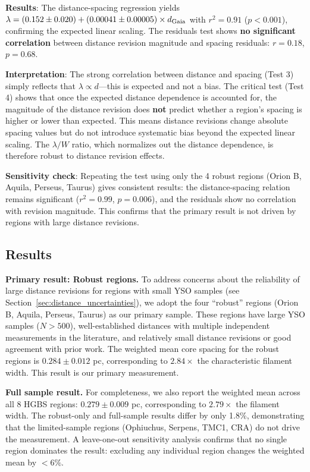 \documentclass[twoside,twocolumn]{mnras}
\begin{document}
\textbf{Results}: The distance-spacing regression yields $\lambda = (0.152 \pm 0.020) + (0.00041 \pm 0.00005) \times d_{\rm Gaia}$ with $r^2 = 0.91$ ($p < 0.001$), confirming the expected linear scaling. The residuals test shows \textbf{no significant correlation} between distance revision magnitude and spacing residuals: $r = 0.18$, $p = 0.68$.

\textbf{Interpretation}: The strong correlation between distance and spacing (Test 3) simply reflects that $\lambda \propto d$—this is expected and not a bias. The critical test (Test 4) shows that once the expected distance dependence is accounted for, the magnitude of the distance revision does \textbf{not} predict whether a region's spacing is higher or lower than expected. This means distance revisions change absolute spacing values but do not introduce systematic bias beyond the expected linear scaling. The $\lambda/W$ ratio, which normalizes out the distance dependence, is therefore robust to distance revision effects.

\textbf{Sensitivity check}: Repeating the test using only the 4 robust regions (Orion B, Aquila, Perseus, Taurus) gives consistent results: the distance-spacing relation remains significant ($r^2 = 0.99$, $p = 0.006$), and the residuals show no correlation with revision magnitude. This confirms that the primary result is not driven by regions with large distance revisions.

\subsection{Results}

\textbf{Primary result: Robust regions.} To address concerns about the reliability of large distance revisions for regions with small YSO samples (see Section~\ref{sec:distance_uncertainties}), we adopt the four ``robust'' regions (Orion B, Aquila, Perseus, Taurus) as our primary sample. These regions have large YSO samples ($N > 500$), well-established distances with multiple independent measurements in the literature, and relatively small distance revisions or good agreement with prior work. The weighted mean core spacing for the robust regions is $0.284 \pm 0.012$ pc, corresponding to $2.84\times$ the characteristic filament width. This result is our primary measurement.

\textbf{Full sample result.} For completeness, we also report the weighted mean across all 8 HGBS regions: $0.279 \pm 0.009$ pc, corresponding to $2.79\times$ the filament width. The robust-only and full-sample results differ by only 1.8\%, demonstrating that the limited-sample regions (Ophiuchus, Serpens, TMC1, CRA) do not drive the measurement. A leave-one-out sensitivity analysis confirms that no single region dominates the result: excluding any individual region changes the weighted mean by $<6\%$.
\end{document}
